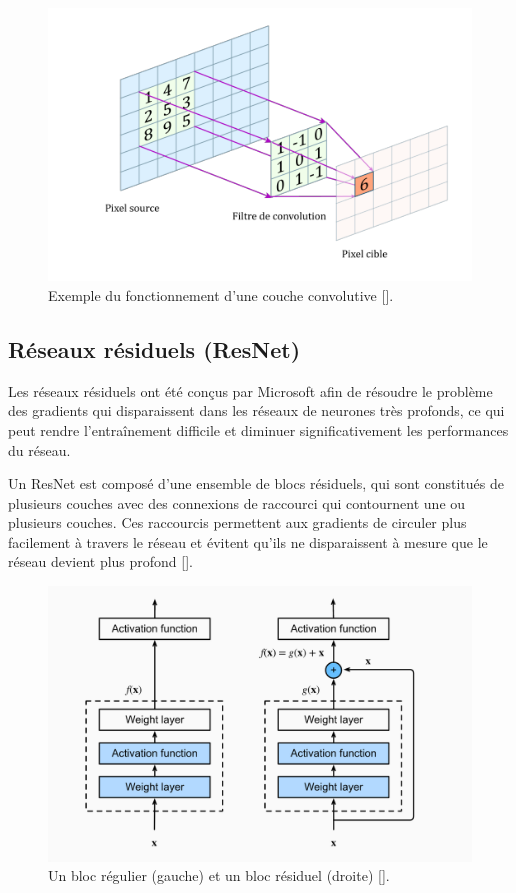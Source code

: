 \begin{figure}[hbt!]
	\centering
	\includegraphics[width=12
		cm]{images_pfe/layerconv.png}
	\caption{Exemple du fonctionnement d'une couche convolutive [\cite{kimura_yoshinaga_sekijima_azechi_baba_2019}].}
	\label{fig:conv}
\end{figure}
\FloatBarrier
\medskip

\subsection{Réseaux résiduels (ResNet)}
Les réseaux résiduels ont été conçus par Microsoft afin de résoudre le problème
des gradients qui disparaissent dans les réseaux de neurones très profonds, ce
qui peut rendre l'entraînement difficile et diminuer significativement les
performances du réseau.

\medskip
Un ResNet est composé d'une ensemble de blocs résiduels, qui sont constitués de plusieurs couches avec des connexions de raccourci qui contournent une ou plusieurs couches. Ces raccourcis permettent aux gradients de circuler plus facilement à travers le réseau et évitent qu'ils ne disparaissent à mesure que le réseau devient plus profond [\cite{He_2016_CVPR}].

\begin{figure}[hbt!]
	\centering
	\includegraphics[width=12cm]{images_pfe/residual-net.png}
	\caption{Un bloc régulier (gauche) et un bloc résiduel (droite) [\cite{dong_niu_li_xie_zou_ye_wei_pan_2022}].}
	\label{fig:residual-net}
\end{figure}
\FloatBarrier

